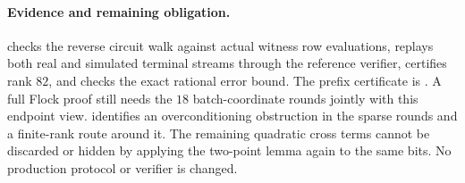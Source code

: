 \paragraph{Evidence and remaining obligation.}  checks the reverse circuit walk against actual witness row evaluations, replays both real and simulated terminal streams through the reference verifier, certifies rank $82$, and checks the exact rational error bound. The prefix certificate is . A full Flock proof still needs the $18$ batch-coordinate rounds jointly with this endpoint view.  identifies an overconditioning obstruction in the sparse rounds and a finite-rank route around it. The remaining quadratic cross terms cannot be discarded or hidden by applying the two-point lemma again to the same bits. No production protocol or verifier is changed.
